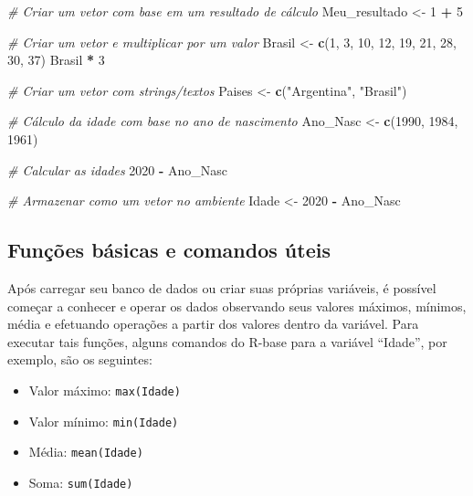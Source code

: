 \documentclass[
  10pt,
  brazil,
  a4paper,
  twoside, notitlepage, openright]{book}
\newenvironment{Shaded}{\begin{snugshade}}{\end{snugshade}}
\newcommand{\CommentTok}[1]{\textcolor[rgb]{0.56,0.35,0.01}{\textit{#1}}}
\newcommand{\DecValTok}[1]{\textcolor[rgb]{0.00,0.00,0.81}{#1}}
\newcommand{\KeywordTok}[1]{\textcolor[rgb]{0.13,0.29,0.53}{\textbf{#1}}}
\newcommand{\NormalTok}[1]{#1}
\newcommand{\OperatorTok}[1]{\textcolor[rgb]{0.81,0.36,0.00}{\textbf{#1}}}
\newcommand{\StringTok}[1]{\textcolor[rgb]{0.31,0.60,0.02}{#1}}
\providecommand{\tightlist}{%
  \setlength{\itemsep}{0pt}\setlength{\parskip}{0pt}}
\begin{document}
\begin{Shaded}
\begin{Highlighting}[]
\CommentTok{# Criar um vetor com base em um resultado de cálculo}
\NormalTok{Meu_resultado <-}\StringTok{ }\DecValTok{1} \OperatorTok{+}\StringTok{ }\DecValTok{5}

\CommentTok{# Criar um vetor e multiplicar por um valor}
\NormalTok{Brasil <-}\StringTok{ }\KeywordTok{c}\NormalTok{(}\DecValTok{1}\NormalTok{, }\DecValTok{3}\NormalTok{, }\DecValTok{10}\NormalTok{, }\DecValTok{12}\NormalTok{, }\DecValTok{19}\NormalTok{, }\DecValTok{21}\NormalTok{, }\DecValTok{28}\NormalTok{, }\DecValTok{30}\NormalTok{, }\DecValTok{37}\NormalTok{)}
\NormalTok{Brasil }\OperatorTok{*}\StringTok{ }\DecValTok{3}

\CommentTok{# Criar um vetor com strings/textos}
\NormalTok{Paises <-}\StringTok{ }\KeywordTok{c}\NormalTok{(}\StringTok{"Argentina"}\NormalTok{, }\StringTok{"Brasil"}\NormalTok{) }

\CommentTok{# Cálculo da idade com base no ano de nascimento}
\NormalTok{Ano_Nasc <-}\StringTok{ }\KeywordTok{c}\NormalTok{(}\DecValTok{1990}\NormalTok{, }\DecValTok{1984}\NormalTok{, }\DecValTok{1961}\NormalTok{)}

\CommentTok{# Calcular as idades}
\DecValTok{2020} \OperatorTok{-}\StringTok{ }\NormalTok{Ano_Nasc}

\CommentTok{# Armazenar como um vetor no ambiente}
\NormalTok{Idade <-}\StringTok{ }\DecValTok{2020} \OperatorTok{-}\StringTok{ }\NormalTok{Ano_Nasc}
\end{Highlighting}
\end{Shaded}

\hypertarget{funuxe7uxf5es-buxe1sicas-e-comandos-uxfateis}{%
\subsection{Funções básicas e comandos úteis}\label{funuxe7uxf5es-buxe1sicas-e-comandos-uxfateis}}

Após carregar seu banco de dados ou criar suas próprias variáveis, é possível começar a conhecer e operar os dados observando seus valores máximos, mínimos, média e efetuando operações a partir dos valores dentro da variável. Para executar tais funções, alguns comandos do R-base para a variável ``Idade'', por exemplo, são os seguintes:

\begin{itemize}
\tightlist
\item
  Valor máximo: \texttt{max(Idade)}
\item
  Valor mínimo: \texttt{min(Idade)}
\item
  Média: \texttt{mean(Idade)}
\item
  Soma: \texttt{sum(Idade)}
\end{itemize}
\end{document}
